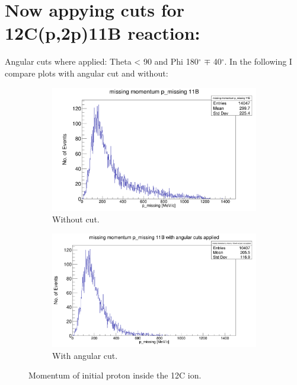 \documentclass{report}
\begin{document}
\section{Now appying cuts for 12C(p,2p)11B reaction:}
Angular cuts where applied: Theta < 90 and Phi 180$^{\circ}$ $\mp$ 40$^{\circ}$. In the following I compare plots with angular cut and without:\newline
\begin{figure}[ht]
\begin{subfigure}{.5\textwidth}
  \centering
  \includegraphics[width=\linewidth]{missing_mom_11B.png}  
  \caption{Without cut.}
  \label{fig:sub-first}
\end{subfigure}
\begin{subfigure}{.5\textwidth}
  \centering
  \includegraphics[width=\linewidth]{missing_mom_11B_cut.png}  
  \caption{With angular cut.}
  \label{fig:sub-second}
\end{subfigure}
\caption{Momentum of initial proton inside the 12C ion.}
\label{fig:missing_mom_11B_cut}
\end{figure} 
\end{document}
